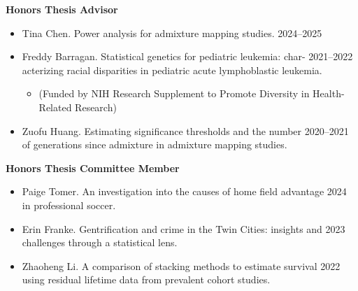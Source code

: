 \documentclass[margin]{res}
\begin{document}
\begin{resume}

\textbf{Honors Thesis Advisor}
\begin{itemize}
\item Tina Chen. Power analysis for admixture mapping studies. \hfill 2024--2025
\item Freddy Barragan. Statistical genetics for pediatric leukemia: char- \hfill 2021--2022 \\ acterizing racial disparities in pediatric acute lymphoblastic leukemia.
	\begin{itemize}[leftmargin=-0in]  \vspace{-0.2cm}
	\item[]\begin{footnotesize}(Funded by NIH Research Supplement to Promote Diversity in Health-Related Research) \end{footnotesize}
	\end{itemize}
\item Zuofu Huang. Estimating significance thresholds and the number  \hfill 2020--2021 \\of generations since admixture in admixture mapping studies. %
\end{itemize}

\textbf{Honors Thesis Committee Member}
\begin{itemize}
\item Paige Tomer.  An investigation into the causes of home field advantage \hfill 2024 \\ in professional soccer. 
\item Erin Franke. Gentrification and crime in the Twin Cities: insights and \hfill 2023 \\ challenges through a statistical lens. 
\item Zhaoheng Li. A comparison of stacking methods to estimate survival  \hfill 2022 \\ using residual lifetime data from prevalent cohort studies.  %
\end{itemize}


\end{resume}
\end{document}
